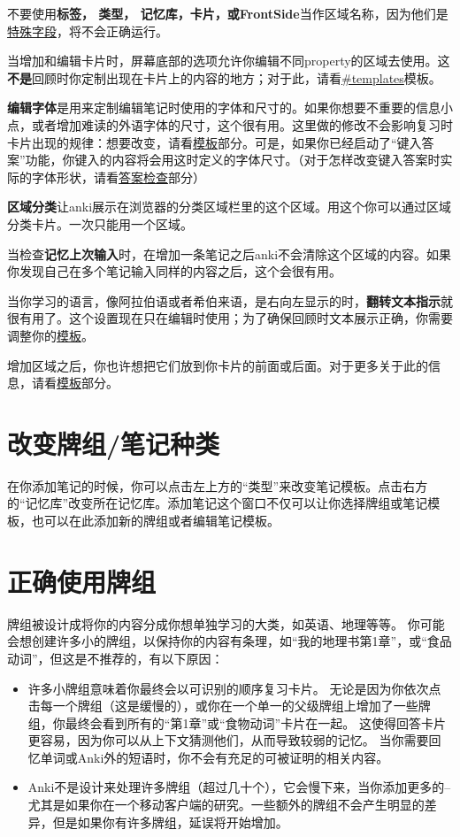 \documentclass[a4paper]{book}
\begin{document}
	
	\begin{shaded}
		不要使用\textbf{标签， 类型， 记忆库，卡片，或FrontSide}当作区域名称，因为他们是\hyperref[specialfields]{特殊字段}，将不会正确运行。
	\end{shaded}
	
	当增加和编辑卡片时，屏幕底部的选项允许你编辑不同property的区域去使用。这\textbf{不是}回顾时你定制出现在卡片上的内容的地方；对于此，请看\url{#templates}模板。
	
	\textbf{编辑字体}是用来定制编辑笔记时使用的字体和尺寸的。如果你想要不重要的信息小点，或者增加难读的外语字体的尺寸，这个很有用。这里做的修改不会影响复习时卡片出现的规律：想要改变，请看\hyperref[template]{模板}部分。可是，如果你已经启动了“键入答案”功能，你键入的内容将会用这时定义的字体尺寸。（对于怎样改变键入答案时实际的字体形状，请看\hyperref[typinganswers]{答案检查}部分）
	
	\textbf{区域分类}让anki展示在浏览器的分类区域栏里的这个区域。用这个你可以通过区域分类卡片。一次只能用一个区域。
	
	当检查\textbf{记忆上次输入}时，在增加一条笔记之后anki不会清除这个区域的内容。如果你发现自己在多个笔记输入同样的内容之后，这个会很有用。
	
	当你学习的语言，像阿拉伯语或者希伯来语，是右向左显示的时，\textbf{翻转文本指示}就很有用了。这个设置现在只在编辑时使用；为了确保回顾时文本展示正确，你需要调整你的\hyperref[templates]{模板}。
	
	增加区域之后，你也许想把它们放到你卡片的前面或后面。对于更多关于此的信息，请看\hyperref[templates]{模板}部分。              
	
	\section{改变牌组/笔记种类}
	
	在你添加笔记的时候，你可以点击左上方的“类型”来改变笔记模板。点击右方的“记忆库”改变所在记忆库。添加笔记这个窗口不仅可以让你选择牌组或笔记模板，也可以在此添加新的牌组或者编辑笔记模板。
	
	\section{正确使用牌组}\label{manydecks}
	牌组被设计成将你的内容分成你想单独学习的大类，如英语、地理等等。 你可能会想创建许多小的牌组，以保持你的内容有条理，如“我的地理书第1章”，或“食品动词”，但这是不推荐的，有以下原因：
	
	\begin{itemize}
		\itemsep1pt\parskip0pt
		\item 许多小牌组意味着你最终会以可识别的顺序复习卡片。 无论是因为你依次点击每一个牌组（这是缓慢的），或你在一个单一的父级牌组上增加了一些牌组，你最终会看到所有的“第1章”或“食物动词”卡片在一起。 这使得回答卡片更容易，因为你可以从上下文猜测他们，从而导致较弱的记忆。 当你需要回忆单词或Anki外的短语时，你不会有充足的可被证明的相关内容。
		\item Anki不是设计来处理许多牌组（超过几十个），它会慢下来，当你添加更多的–尤其是如果你在一个移动客户端的研究。一些额外的牌组不会产生明显的差异，但是如果你有许多牌组，延误将开始增加。
	\end{itemize}
	
\end{document}
